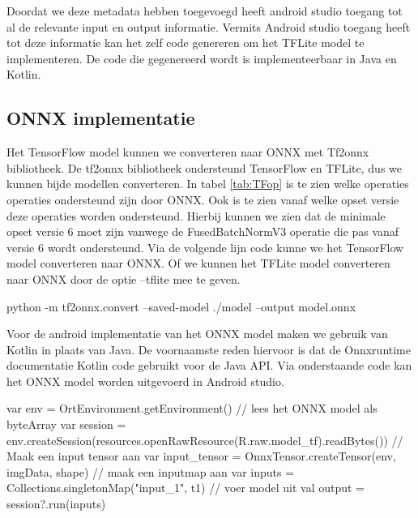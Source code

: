 Doordat we deze metadata hebben toegevoegd heeft android studio toegang tot al de relevante input en output informatie.
Vermits Android studio toegang heeft tot deze informatie kan het zelf code genereren om het TFLite model te implementeren.
De code die gegenereerd wordt is implementeerbaar in Java en Kotlin.

\subsection{ONNX implementatie} \label{classonnx}
Het TensorFlow model kunnen we converteren naar ONNX met Tf2onnx bibliotheek.
De tf2onnx bibliotheek ondersteund TensorFlow en TFLite, dus we kunnen bijde modellen converteren.
In tabel \ref{tab:TFop} is te zien welke operaties operaties ondersteund zijn door ONNX.
Ook is te zien vanaf welke opset versie deze operaties worden ondersteund.
Hierbij kunnen we zien dat de minimale opset versie 6 moet zijn vanwege de FusedBatchNormV3 operatie die pas vanaf versie 6 wordt ondersteund.
Via de volgende lijn code kunne we het TensorFlow model converteren naar ONNX.
Of we kunnen het TFLite model converteren naar ONNX door de optie --tflite mee te geven.

\begin{python}
python -m tf2onnx.convert --saved-model ./model --output model.onnx
\end{python}

Voor de android implementatie van het ONNX model maken we gebruik van Kotlin in plaats van Java.
De voornaamste reden hiervoor is dat de Onnxruntime documentatie Kotlin code gebruikt voor de Java API.
Via onderstaande code kan het ONNX model worden uitgevoerd in Android studio.

\begin{python} 
var env = OrtEnvironment.getEnvironment()
// lees het ONNX model als byteArray
var session = env.createSession(resources.openRawResource(R.raw.model_tf).readBytes())
// Maak een input tensor aan
var input_tensor = OnnxTensor.createTensor(env, imgData, shape)
// maak een inputmap aan
var inputs = Collections.singletonMap("input_1", t1)
// voer model uit
val output = session?.run(inputs)
\end{python}

